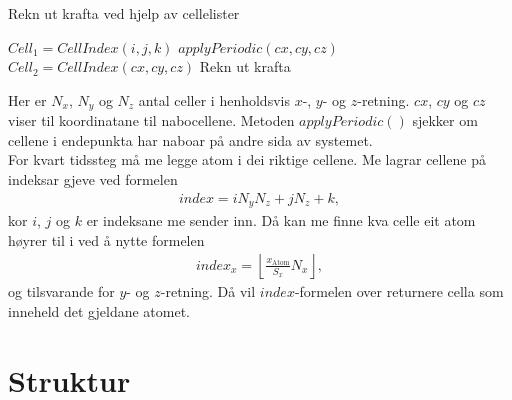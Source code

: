 \documentclass[12pt, a4paper]{article}
\theoremstyle{definition}
\begin{document}
        \begin{algorithm}[H]
            \caption{Rekn ut krafta ved hjelp av cellelister}
            \label{Cellelister}
            \begin{algorithmic}[1]
                            \State $Cell_{1} = CellIndex(i, j, k)$
                                        \State $applyPeriodic(cx, cy, cz)$
                                        \State $Cell_{2} = CellIndex(cx, cy, cz)$
                                                \State Rekn ut krafta
                                            \EndFor
                                        \EndFor
                                    \EndFor
                                \EndFor
                            \EndFor
                        \EndFor
                    \EndFor
                \EndFor
            \end{algorithmic}
        \end{algorithm}
        Her er $N_x$, $N_y$ og $N_z$ antal celler i henholdsvis $x$-, $y$- og $z$-retning. $cx$, $cy$ og $cz$ viser til koordinatane til nabocellene. Metoden $applyPeriodic()$ 
        sjekker om cellene i endepunkta har naboar på andre sida av systemet. \\
        For kvart tidssteg må me legge atom i dei riktige cellene. Me lagrar cellene på indeksar gjeve ved formelen
        \begin{align*}
            index = iN_yN_z + jN_z + k,
        \end{align*}
        kor $i$, $j$ og $k$ er indeksane me sender inn. Då kan me finne kva celle eit atom høyrer til i ved å nytte formelen
        \begin{align*}
            index_x = \left \lfloor \frac{x_{\text{Atom}}}{S_{x}} N_{x}\right \rfloor,
        \end{align*}
        og tilsvarande for $y$- og $z$-retning. Då vil $index$-formelen over returnere cella som inneheld det gjeldane atomet.

\newpage
\section*{Struktur}
\end{document}
